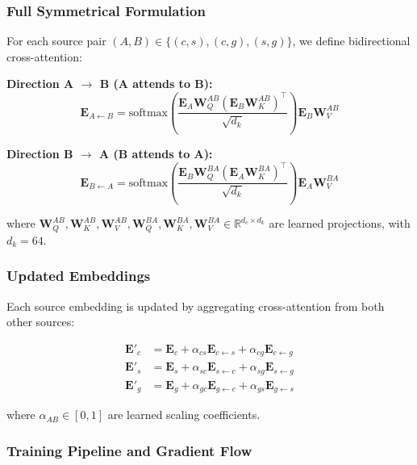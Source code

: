 \documentclass[10pt,twocolumn]{article}
\begin{document}
\subsubsection{Full Symmetrical Formulation}

For each source pair $(A, B) \in \{(c,s), (c,g), (s,g)\}$, we define bidirectional cross-attention:

\textbf{Direction A $\rightarrow$ B (A attends to B):}
\begin{equation}
\mathbf{E}_{A \leftarrow B} = \text{softmax}\left(\frac{\mathbf{E}_A \mathbf{W}_Q^{AB} (\mathbf{E}_B \mathbf{W}_K^{AB})^\top}{\sqrt{d_k}}\right) \mathbf{E}_B \mathbf{W}_V^{AB}
\end{equation}

\textbf{Direction B $\rightarrow$ A (B attends to A):}
\begin{equation}
\mathbf{E}_{B \leftarrow A} = \text{softmax}\left(\frac{\mathbf{E}_B \mathbf{W}_Q^{BA} (\mathbf{E}_A \mathbf{W}_K^{BA})^\top}{\sqrt{d_k}}\right) \mathbf{E}_A \mathbf{W}_V^{BA}
\end{equation}

where $\mathbf{W}_Q^{AB}, \mathbf{W}_K^{AB}, \mathbf{W}_V^{AB}, \mathbf{W}_Q^{BA}, \mathbf{W}_K^{BA}, \mathbf{W}_V^{BA} \in \mathbb{R}^{d_c \times d_k}$ are learned projections, with $d_k = 64$.

\subsubsection{Updated Embeddings}

Each source embedding is updated by aggregating cross-attention from both other sources:

\begin{align}
\mathbf{E}'_c &= \mathbf{E}_c + \alpha_{cs}\mathbf{E}_{c \leftarrow s} + \alpha_{cg}\mathbf{E}_{c \leftarrow g} \\
\mathbf{E}'_s &= \mathbf{E}_s + \alpha_{sc}\mathbf{E}_{s \leftarrow c} + \alpha_{sg}\mathbf{E}_{s \leftarrow g} \\
\mathbf{E}'_g &= \mathbf{E}_g + \alpha_{gc}\mathbf{E}_{g \leftarrow c} + \alpha_{gs}\mathbf{E}_{g \leftarrow s}
\end{align}

where $\alpha_{AB} \in [0, 1]$ are learned scaling coefficients.

\subsubsection{Training Pipeline and Gradient Flow}
\label{sec:training_pipeline}
\end{document}
